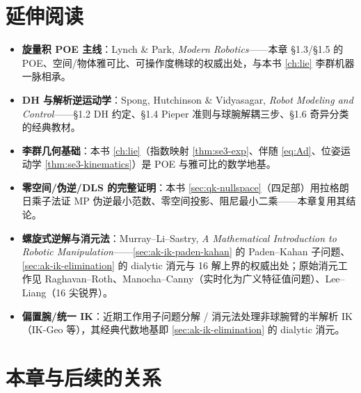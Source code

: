\section*{延伸阅读}

\begin{itemize}
  \item \textbf{旋量积 POE 主线}：Lynch \& Park, \emph{Modern Robotics}\cite{lynch2017modern}——本章 §1.3/§1.5 的 POE、空间/物体雅可比、可操作度椭球的权威出处，与本书 \cref{ch:lie} 李群机器一脉相承。
  \item \textbf{DH 与解析逆运动学}：Spong, Hutchinson \& Vidyasagar, \emph{Robot Modeling and Control}\cite{spong2006robot}——§1.2 DH 约定、§1.4 Pieper 准则与球腕解耦三步、§1.6 奇异分类的经典教材。
  \item \textbf{李群几何基础}：本书 \cref{ch:lie}（指数映射 \cref{thm:se3-exp}、伴随 \cref{eq:Ad}、位姿运动学 \cref{thm:se3-kinematics}）是 POE 与雅可比的数学地基。
  \item \textbf{零空间/伪逆/DLS 的完整证明}：本书 \cref{sec:qk-nullspace}（四足部）用拉格朗日乘子法证 MP 伪逆最小范数、零空间投影、阻尼最小二乘——本章复用其结论。
  \item \textbf{螺旋式逆解与消元法}：Murray--Li--Sastry, \emph{A Mathematical Introduction to Robotic Manipulation}\cite{murray1994mathematical}——\cref{sec:ak-ik-paden-kahan} 的 Paden--Kahan 子问题、\cref{sec:ak-ik-elimination} 的 dialytic 消元与 16 解上界的权威出处；原始消元工作见 Raghavan--Roth\cite{raghavan1993inverse}、Manocha--Canny（实时化为广义特征值问题）\cite{manocha1994realtime}、Lee--Liang（16 尖锐界）\cite{lee1988displacement}。
  \item \textbf{偏置腕/统一 IK}：近期工作用子问题分解 / 消元法处理非球腕臂的半解析 IK（IK-Geo 等），其经典代数地基即 \cref{sec:ak-ik-elimination} 的 dialytic 消元。
\end{itemize}

\section*{本章与后续的关系}

